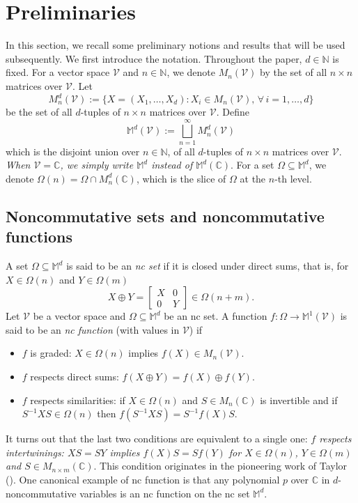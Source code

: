 \documentclass[12pt]{amsart}%
\numberwithin{equation}{section}
\newcommand{\cV}{\mathcal{V}}
\newcommand{\bC}{\mathbb{C}}
\newcommand{\bM}{\mathbb{M}}
\newcommand{\bN}{\mathbb{N}}
\newcommand{\N}{\mathbb{N}}
\newcommand{\C}{\mathbb{C}}
\begin{document}
\section{Preliminaries}\label{Sec: pre}
In this section, we recall some preliminary notions and results that will be used subsequently. We first introduce the notation. Throughout the paper, $d\in\N$ is fixed.
For a vector space $\cV$ and $n\in\bN$, we denote $M_n(\cV)$ by the set of all $n\times n$ matrices over $\cV$. Let
\[
M_n^d(\cV):=\{X=(X_1,\ldots,X_d):X_i\in M_n(\cV),\,\forall\, i=1,\ldots,d\}
\]
be the set of all $d$-tuples of $n\times n$ matrices over $\cV$.
Define  
\[
\bM^d(\cV):=\bigsqcup_{n=1}^{\infty} M_n^d(\cV)
\]
which is the disjoint union over $n\in\bN$, of all $d$-tuples of $n\times n$ matrices over $\cV$. \textit{When $\cV=\bC$, we simply write $\bM^d$ instead of $\bM^d(\bC)$}. For a set $\Omega\subseteq\bM^d$, we denote $\Omega(n)=\Omega\cap M_n^d(\C)$, which is the slice of $\Omega$ at the $n$-th level. 

\subsection{Noncommutative sets and noncommutative functions}\label{Sub: nc function} A set $\Omega\subseteq\bM^d$ is said to be an \textit{nc set} if it is closed under direct sums, that is, for $X\in\Omega(n)$ and $Y\in\Omega(m)$
\[
X\oplus Y=\begin{bmatrix}
    X & 0\\
    0 & Y
\end{bmatrix}\in\Omega(n+m).
\]
Let $\cV$ be a vector space and $\Omega\subseteq \bM^d$ be an nc set. A function $f:\Omega\to\bM^1(\cV)$ is said to be an \textit{nc function} (with values in $\cV$) if 
\begin{itemize}
    \item[(i)] $f$ is graded: $X\in\Omega(n)$ implies $f(X)\in M_n(\cV)$.
    \item[(ii)] $f$ respects direct sums: $f(X\oplus Y)=f(X)\oplus f(Y)$.
    \item[(iii)] $f$ respects similarities: if $X\in\Omega(n)$ and $S\in M_n(\C)$ is invertible and if $S^{-1}XS\in\Omega(n)$ then $f(S^{-1}XS)=S^{-1}f(X)S$.
\end{itemize}
It turns out that the last two conditions are equivalent to a single one: \textit{$f$ respects intertwinings: $XS= SY$ implies $f(X)S= Sf(Y)$ for $X\in\Omega(n)$, $Y\in\Omega(m)$ and $S\in M_{n\times m}(\C)$}. This condition originates in the pioneering work of Taylor (\cite{T73}). One canonical example of nc function is that any polynomial $p$ over $\bC$ in $d$-noncommutative variables is an nc function on the nc set $\bM^d$.
 
\end{document}
